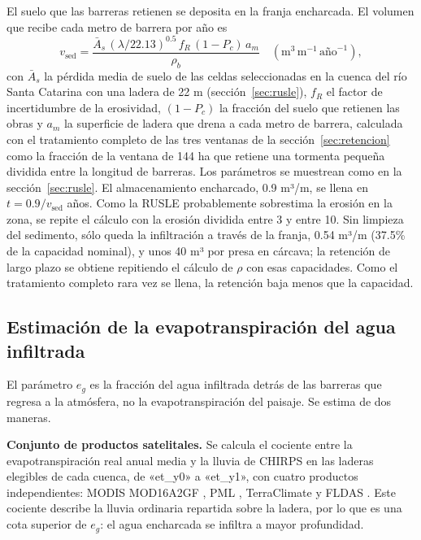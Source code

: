 El suelo que las barreras retienen se deposita en la franja encharcada. El volumen que recibe cada metro de barrera por año es
\begin{equation}
v_{\text{sed}}=\frac{\bar A_{s}\,(\lambda/22.13)^{0.5}\,f_R\,(1-P_c)\,a_m}{\rho_b}\quad(\text{m}^3\,\text{m}^{-1}\,\text{año}^{-1}),
\end{equation}
con $\bar A_s$ la pérdida media de suelo de las celdas seleccionadas en la cuenca del río Santa Catarina con una ladera de 22 m (sección~\ref{sec:rusle}), $f_R$ el factor de incertidumbre de la erosividad, $(1-P_c)$ la fracción del suelo que retienen las obras y $a_m$ la superficie de ladera que drena a cada metro de barrera, calculada con el tratamiento completo de las tres ventanas de la sección~\ref{sec:retencion} como la fracción de la ventana de 144 ha que retiene una tormenta pequeña dividida entre la longitud de barreras. Los parámetros se muestrean como en la sección~\ref{sec:rusle}. El almacenamiento encharcado, 0.9 m³/m, se llena en $t=0.9/v_{\text{sed}}$ años. Como la RUSLE probablemente sobrestima la erosión en la zona, se repite el cálculo con la erosión dividida entre 3 y entre 10. Sin limpieza del sedimento, sólo queda la infiltración a través de la franja, 0.54 m³/m (37.5\% de la capacidad nominal), y unos 40 m³ por presa en cárcava; la retención de largo plazo se obtiene repitiendo el cálculo de $\rho$ con esas capacidades. Como el tratamiento completo rara vez se llena, la retención baja menos que la capacidad.

\subsection{Estimación de la evapotranspiración del agua infiltrada}\label{sec:et}

El parámetro $e_g$ es la fracción del agua infiltrada detrás de las barreras que regresa a la atmósfera, no la evapotranspiración del paisaje. Se estima de dos maneras.

\textbf{Conjunto de productos satelitales.} Se calcula el cociente entre la evapotranspiración real anual media y la lluvia de CHIRPS en las laderas elegibles de cada cuenca, de «et_y0» a «et_y1», con cuatro productos independientes: MODIS MOD16A2GF , PML , TerraClimate  y FLDAS . Este cociente describe la lluvia ordinaria repartida sobre la ladera, por lo que es una cota superior de $e_g$: el agua encharcada se infiltra a mayor profundidad.

